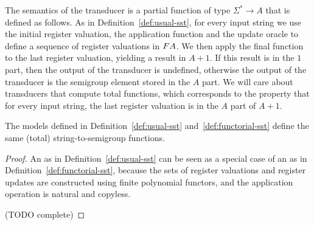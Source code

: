 The semantics of the transducer is a partial function of type 
$\Sigma^* \to A$
that is defined as follows. As in Definition~\ref{def:usual-sst}, for every input string we use  the initial register valuation, the application function and the update oracle to define a sequence of register valuations in $\functor A$. We then apply the final function to the last register valuation, yielding a result in $A+1$.  If this result is in the $1$ part, then the output of the transducer is undefined, otherwise the output of the transducer is the semigroup element stored in the $A$ part. We will care about transducers that compute total functions, which corresponds to the property  that for every input string, the last register valuation is in the $A$ part of $A+1$.

\begin{lemma}\label{lem:functorial-sst-complete}
    The models defined in Definition~\ref{def:usual-sst} and~\ref{def:functorial-sst} define the same (total) string-to-semigroup functions.
\end{lemma}
\begin{proof}
    An \sst as in Definition~\ref{def:usual-sst} can be seen as a special case of an \sst as in Definition~\ref{def:functorial-sst}, because the sets of register valuations and register updates are constructed using finite polynomial functors, and the application operation is natural and copyless. 

    (TODO complete)
\end{proof}

